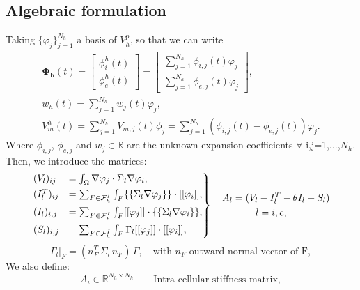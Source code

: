 \documentclass[a4paper,11pt]{article}
\begin{document}
    \subsection{Algebraic formulation}
    Taking $\{\varphi_j\}_{j=1}^{N_h}$ a basis of $V_h^p$, so that we can write
    \begin{equation*}
    \begin{gathered}
    \bm{\Phi_h}(t) = \begin{bmatrix} \phi_i^h(t) \\ \phi_e^h(t) \end{bmatrix} = \begin {bmatrix}\sum_{j=1}^{N_h} \phi_{i,j}(t)\varphi_j \\ \sum_{j=1}^{N_h} \phi_{e,j}(t)\varphi_j \end{bmatrix},\\
    w_h(t) = \sum_{j=1}^{N_h}w_j(t)\varphi_j,\\
    V_m^h(t)=\sum_{j=1}^{N_h} V_{m,j}(t) \phi_j=\sum_{j=1}^{N_h}(\phi_{i,j}(t)-\phi_{e,j}(t))\varphi_j.
 \end{gathered}
 \end{equation*}
 Where $\phi_{i,j}$, $\phi_{e,j}$ and $w_j \in \mathbb{R}$ are the unknown expansion coefficients $\forall$ i,j=1,...,$N_h$.
 Then, we introduce the matrices:
 \begin{equation*}
\begin{rcases}
(V_l)_{ij} &= \int_{\Omega}\nabla\varphi_j \cdot \Sigma_l \nabla \varphi_i,
\\ (I_l^T)_{ij} &= \sum_{F \in \mathcal{F}_h^I} \int_{F} \{\{\Sigma_l \nabla\varphi_j\}\} \cdot [[\varphi_i]],
\\ (I_l)_{i,j} &= \sum_{F \in \mathcal{F}_h^I} \int_{F} [[\varphi_j]] \cdot \{\{\Sigma_l \nabla \varphi_i\}\},
\\(S_l)_{i,j} &= \sum_{F \in \mathcal{F}_h^I} \int_{F} \Gamma_l[[\varphi_j]] \cdot [[\varphi_i]],
\end{rcases}
\begin{gathered}
\quad A_l = (V_l -I_l^T - \theta I_l + S_l)\\
l=i,e, \\
\end{gathered}
\end{equation*}
\begin{equation*}
\Gamma_l\vert_F = (n_F^T \, \Sigma_l \, n_F) \,\Gamma, \quad \text{with } n_F \text{ outward normal vector of F},
\end{equation*}
We also define:
\begin{equation*}
A_i \in \mathbb{R}^{N_h \times N_h} \qquad{\text{Intra-cellular stiffness matrix}},
\end{equation*}
\end{document}
